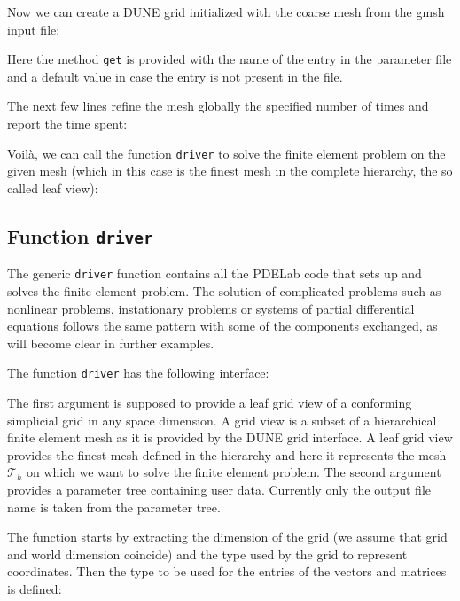 \documentclass[a4paper,12pt]{article}
\begin{document}
Now we can create a DUNE grid initialized with the coarse mesh
from the gmsh input file:

Here the method \lstinline{get} is provided with the name of
the entry in the parameter file and a default value in case the
entry is not present in the file.

The next few lines refine the mesh globally the specified number of times
and report the time spent:


Voilà, we can call the function \lstinline{driver} to solve the finite
element problem on the given mesh (which in this case is the finest mesh in the
complete hierarchy, the so called leaf view):


\subsection{Function \lstinline{driver}}

The generic \lstinline{driver} function contains all the PDELab code that
sets up and solves the finite element problem. The solution of
complicated problems such as nonlinear problems, instationary problems or
systems of partial differential equations follows the same pattern with
some of the components exchanged, as will become clear in further examples.

The function \lstinline{driver} has the following interface:

The first argument is supposed to provide a leaf grid view of a conforming simplicial
grid in any space dimension. A grid view is a subset of a hierarchical finite element
mesh as it is provided by the DUNE grid interface. A leaf grid view provides the
finest mesh defined in the hierarchy and here it represents the mesh $\mathcal{T}_h$
on which we want to solve the finite element problem.
The second argument provides a 
parameter tree containing user data. Currently only the output file name is
taken from the parameter tree.

The function starts by extracting the dimension of the grid (we assume
that grid and world dimension coincide) and the type used by the grid
to represent coordinates. Then the type to be used for the entries
of the vectors and matrices is defined:

\end{document}

